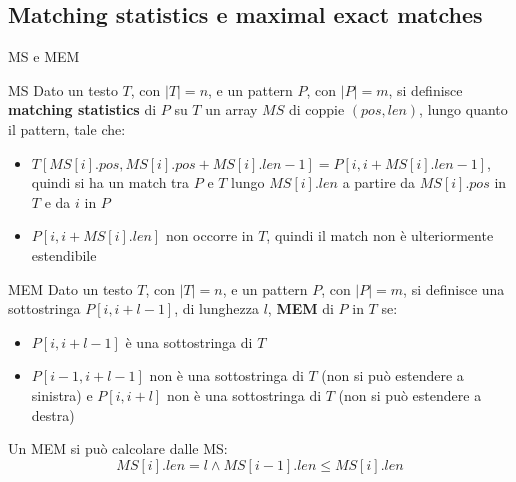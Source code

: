 \documentclass{beamer}
\begin{document}
\subsection{Matching statistics e maximal exact matches} 
\begin{frame}{MS e MEM}
  \begin{block}{MS}
      \footnotesize
      Dato un testo $T$, con $|T|=n$, e un pattern $P$, con $|P|=m$, si
      definisce \textbf{matching statistics} di $P$ su $T$ un array $MS$ di
      coppie $(pos, len)$, lungo quanto il pattern, tale che:
      \begin{itemize}
        \item $T[MS[i].pos,MS[i].pos+MS[i].len-1]=P[i,i+MS[i].len-1]$, quindi si
        ha un match tra $P$ e $T$ lungo $MS[i].len$ a partire da $MS[i].pos$ in
        $T$ e da $i$ in $P$
        \item $P[i,i+MS[i].len]$ non occorre in $T$, quindi il match non è
        ulteriormente estendibile 
      \end{itemize}
  \end{block}
  \pause
  \begin{block}{MEM}
      \footnotesize
      Dato un testo $T$, con $|T|=n$, e un pattern $P$, con $|P|=m$, si definisce
      una sottostringa $P[i,i+l-1]$, di lunghezza $l$, \textbf{MEM} di $P$ in $T$
      se:
      \begin{itemize}
        \item $P[i,i+l-1]$ è una sottostringa di $T$
        \item $P[i-1,i+l-1]$ non è una sottostringa di $T$ (non si può estendere a
        sinistra) e $P[i,i+l]$ non è una sottostringa di $T$ (non si può estendere a
        destra) 
      \end{itemize}
      Un MEM si può calcolare dalle MS:
      \[MS[i].len=l\land MS[i-1].len\leq MS[i].len\]
  \end{block}
\end{frame}
\end{document}
